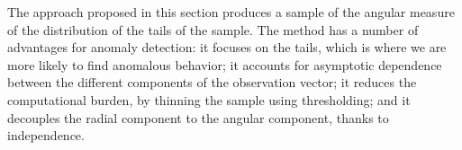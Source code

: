 The approach proposed in this section produces a sample of the angular measure 
    of the distribution of the tails of the sample. The method has a number of 
    advantages for anomaly detection: it focuses on the tails, which is where we 
    are more likely to find anomalous behavior;  it accounts for asymptotic 
    dependence between the different components of the observation vector; it
    reduces the computational burden, by thinning the sample using thresholding; 
    and it decouples the radial component to the angular component, thanks to 
    independence. 

